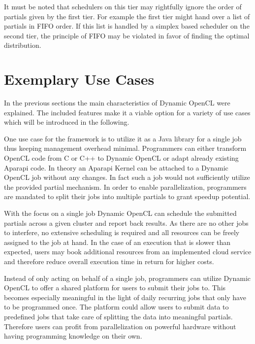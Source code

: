It must be noted that schedulers on this tier may rightfully ignore the order of partials given by the first tier. For example the first tier might hand over a list of partials in FIFO order. If this list is handled by a simplex based scheduler on the second tier, the principle of FIFO may be violated in favor of finding the optimal distribution.

\section{Exemplary Use Cases}
\label{use_cases}
In the previous sections the main characteristics of Dynamic OpenCL were explained. The included features make it a viable option for a variety of use cases which will be introduced in the following.

\begin{description}[style=nextline]
	\item[Job Based Library]
	One use case for the framework is to utilize it as a Java library for a single job thus keeping management overhead minimal. Programmers can either transform OpenCL code from C or C++ to Dynamic OpenCL or adapt already existing Aparapi code. In theory an Aparapi Kernel can be attached to a Dynamic OpenCL job without any changes. In fact such a job would not sufficiently utilize the provided partial mechanism. In order to enable parallelization, programmers are mandated to split their jobs into multiple partials to grant speedup potential.

	With the focus on a single job Dynamic OpenCL can schedule the submitted partials across a given cluster and report back results. As there are no other jobs to interfere, no extensive scheduling is required and all resources can be freely assigned to the job at hand. In the case of an execution that is slower than expected, users may book additional resources from an implemented cloud service and therefore reduce overall execution time in return for higher costs.

	\item[Local Cluster Provider]

	Instead of only acting on behalf of a single job, programmers can utilize Dynamic OpenCL to offer a shared platform for users to submit their jobs to. This becomes especially meaningful in the light of daily recurring jobs that only have to be programmed once. The platform could allow users to submit data to predefined jobs that take care of splitting the data into meaningful partials. Therefore users can profit from parallelization on powerful hardware without having programming knowledge on their own.


\end{description}
